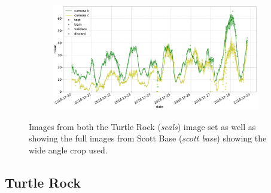 \begin{figure}[h!]
\begin{subfigure}[t]{1.0\linewidth}
  \includegraphics[width=1.0\linewidth]{charts/seals/scott_base.pdf}
  \caption{}
\end{subfigure}

\caption{ Images from both the Turtle Rock (\emph{seals}) image set as well as showing the full images from Scott Base (\emph{scott base}) showing the wide angle crop used.  }
\label {fig:weddell_images}
\end{figure}

\subsection{Turtle Rock \cite{Eisert2015}}
 
 
 
